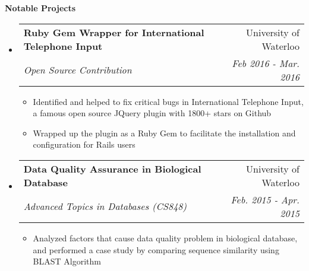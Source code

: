 \documentclass[letterpaper,10pt]{article}
\makeatletter
\newcommand{\resitem}[1]{\item #1 \vspace{-2pt}}
\newcommand{\resheading}[1]{{\large \colorbox{mygrey}{\begin{minipage}{\textwidth}{\textbf{#1 \vphantom{p\^{E}}}}\end{minipage}}}}
\newcommand{\ressubheading}[4]{
\begin{tabular*}{7.0in}{l@{\extracolsep{\fill}}r}
		\textbf{#1} & #2 \\
		\textit{#3} & \textit{#4} \\
\end{tabular*}\vspace{-6pt}}
\makeatother
\begin{document}
\resheading{Notable Projects}
\begin{itemize}
\itemsep0em
\item
    \ressubheading{Ruby Gem Wrapper for International Telephone Input}{University of Waterloo}{Open Source Contribution}{Feb 2016 - Mar. 2016}
	\begin{itemize}
        \resitem{Identified and helped to fix critical bugs in International Telephone Input, a famous open source JQuery plugin with 1800+ stars on Github}
		\resitem{Wrapped up the plugin as a Ruby Gem to facilitate the installation and configuration for Rails users}
	\end{itemize}
\item
	\ressubheading{Data Quality Assurance in Biological Database}{University of Waterloo}{ Advanced Topics in Databases (CS848)}{ Feb. 2015 - Apr. 2015}
	\begin{itemize}
		\resitem{Analyzed factors that cause data quality problem in biological database, and performed a case study by comparing sequence similarity using BLAST Algorithm}
	\end{itemize}
	
\end{itemize}
\end{document}
